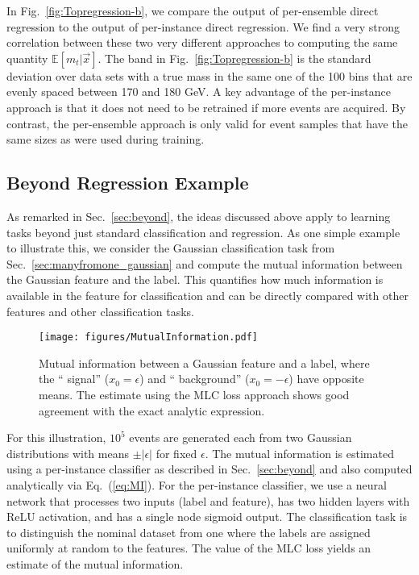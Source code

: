 \documentclass[aps,prx,reprint,preprintnumbers,superscriptaddress,nofootinbib,longbibliography,floatfix]{revtex4-2}
\DeclareRobustCommand{\Sec}[1]{Sec.~\ref{sec:#1}}
\DeclareRobustCommand{\Fig}[1]{Fig.~\ref{fig:#1}}
\DeclareRobustCommand{\Eq}[1]{Eq.~(\ref{eq:#1})}
\begin{document}
In \Fig{Topregression-b}, we compare the output of per-ensemble direct regression to the output of per-instance direct regression.
%
We find a very strong correlation between these two very different approaches to computing the same quantity $\mathbb{E}[m_t|\vec{x}]$.  
%
The band in \Fig{Topregression-b} is the standard deviation over data sets with a true mass in the same one of the 100 bins that are evenly spaced between 170 and 180 GeV.
%
A key advantage of the per-instance approach is that it does not need to be retrained if more events are acquired.
%
By contrast, the per-ensemble approach is only valid for event samples that have the same sizes as were used during training.



\subsection{Beyond Regression Example}
\label{sec:beyondregression}


As remarked in \Sec{beyond}, the ideas discussed above apply to learning tasks beyond just standard classification and regression.
%
As one simple example to illustrate this, we consider the Gaussian classification task from \Sec{manyfromone_gaussian} and compute the mutual information between the Gaussian feature and the label.
%
This quantifies how much information is available in the feature for classification and can be directly compared with other features and other classification tasks.


 \begin{figure}[t]
 \centering
 \texttt{[image: figures/MutualInformation.pdf]}
 \caption{
 Mutual information between a Gaussian feature and a label, where the `` signal'' ($x_0 = \epsilon$) and `` background'' ($x_0 = - \epsilon$) have opposite means.
 The estimate using the MLC loss approach shows good agreement with the exact analytic expression.
 }
 \label{fig:GaussianMI}
 \end{figure}

For this illustration, $10^5$ events are generated each from two Gaussian distributions with means $\pm |\epsilon|$ for fixed $\epsilon$.
%
The mutual information is estimated using a per-instance classifier as described in \Sec{beyond} and also computed analytically via \Eq{MI}.
%
For the per-instance classifier, we use a neural network that processes two inputs (label and feature), has two hidden layers with ReLU activation, and has a single node sigmoid output.
%
The classification task is to distinguish the nominal dataset from one where the labels are assigned uniformly at random to the features.
%
The value of the MLC loss yields an estimate of the mutual information.
\end{document}
